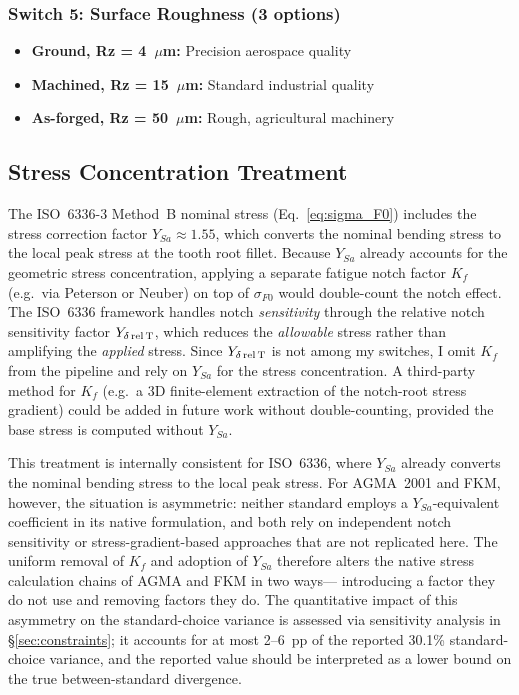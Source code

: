 \documentclass[12pt,a4paper]{article}
\begin{document}
\subsubsection{Switch 5: Surface Roughness (3 options)}

\begin{itemize}
  \item \textbf{Ground, Rz = 4~$\mu$m:} Precision aerospace quality
  \item \textbf{Machined, Rz = 15~$\mu$m:} Standard industrial quality
  \item \textbf{As-forged, Rz = 50~$\mu$m:} Rough, agricultural machinery
\end{itemize}

\subsection{Stress Concentration Treatment}

The ISO~6336-3 Method~B nominal stress (Eq.~\ref{eq:sigma_F0}) includes
the stress correction factor $Y_{Sa} \approx 1.55$, which converts the
nominal bending stress to the local peak stress at the tooth root
fillet. Because $Y_{Sa}$ already accounts for the geometric stress
concentration, applying a separate fatigue notch factor $K_f$ (e.g.\
via Peterson or Neuber) on top of $\sigma_{F0}$ would double-count the
notch effect. The ISO~6336 framework handles notch \emph{sensitivity}
through the relative notch sensitivity factor $Y_{\delta\,\rm rel\,T}$,
which reduces the \emph{allowable} stress rather than amplifying the
\emph{applied} stress. Since $Y_{\delta\,\rm rel\,T}$ is not among my
switches, I omit $K_f$ from the pipeline and rely on $Y_{Sa}$ for the
stress concentration. A third-party method for $K_f$ (e.g.\ a 3D
finite-element extraction of the notch-root stress gradient) could be
added in future work without double-counting, provided the base stress
is computed without $Y_{Sa}$.

This treatment is internally consistent for ISO~6336, where $Y_{Sa}$
already converts the nominal bending stress to the local peak stress.
For AGMA~2001 and FKM, however, the situation is asymmetric: neither
standard employs a $Y_{Sa}$-equivalent coefficient in its native
formulation, and both rely on independent notch sensitivity or
stress-gradient-based approaches that are not replicated here. The
uniform removal of $K_f$ and adoption of $Y_{Sa}$ therefore alters the
native stress calculation chains of AGMA and FKM in two ways---%
introducing a factor they do not use and removing factors they do.
The quantitative impact of this asymmetry on the standard-choice
variance is assessed via sensitivity analysis in \S\ref{sec:constraints}; it accounts for at most 2--6~pp of the
reported 30.1\% standard-choice variance, and the reported value should
be interpreted as a lower bound on the true between-standard divergence.
\end{document}

